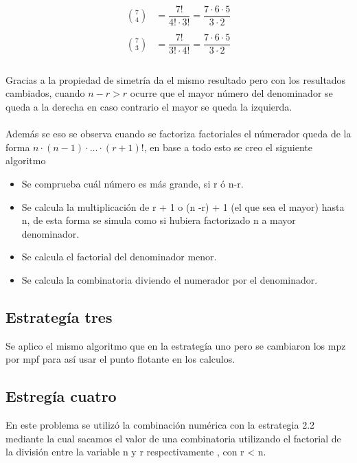 \documentclass[12pt,letterpaper]{scrartcl}
\begin{document}
\[\begin{matrix}
{7 \choose 4}  &= \dfrac{7!}{4! \cdot 3!} = \dfrac{7 \cdot 6 \cdot 5}{3 \cdot 2}\\ 
 &\\
{7 \choose 3}  &= \dfrac{7!}{3!\cdot4!} = \dfrac{7 \cdot 6 \cdot 5}{3 \cdot 2 }\\
\end{matrix}
\]
\\
Gracias a la propiedad de simetría da el mismo resultado pero con los resultados cambiados, cuando $n-r > r$ ocurre que el mayor número del denominador se queda a la derecha en caso contrario el mayor se queda la izquierda.
\\\\
Además se eso se observa cuando se factoriza factoriales el númerador queda de la forma $n \cdot (n-1) \cdot \ldots \cdot (r+1)!$, en base a todo esto se creo el siguiente algoritmo

\begin{itemize}
\item Se comprueba cuál número es más grande, si r ó n-r.


\item Se calcula la multiplicación de r + 1 o (n -r) + 1 (el que sea el mayor) hasta n, de esta forma se simula como si hubiera factorizado n a mayor denominador.

\item Se calcula el factorial del denominador menor.

\item Se calcula la combinatoria diviendo el numerador por el denominador.

\end{itemize}




\subsection{Estrategía tres}

Se aplico el mismo algoritmo que en la estrategía uno pero se cambiaron los mpz por mpf para así usar el punto flotante en los calculos.

\newpage

\subsection{Estregía cuatro}


En este problema se utilizó la combinación numérica con la estrategia 2.2 mediante la cual sacamos el valor de una combinatoria utilizando el factorial de la división entre la variable n y r respectivamente , con r < n.
\end{document}
